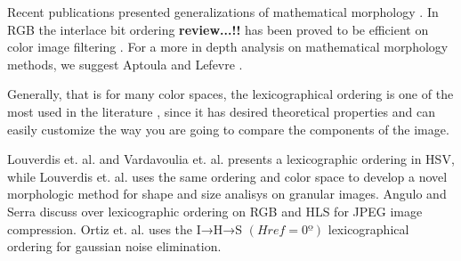 Recent publications presented generalizations of mathematical morphology \cite{ledoux2012limits, van2013group, velasco2012random, lezoray2009learning, velasco2010morphological, burgeth2013morphology, velasco2011supervised, hanbury2001morphological, angulo2010pseudo, aptoula2008alpha, kleefeld2015processing, vazquez2014color}. In RGB the interlace bit ordering \textbf{review...!!} has been proved to be efficient on color image filtering \cite{chanussot1997bit}. For a more in depth analysis on mathematical morphology methods, we suggest Aptoula and Lefevre \cite{aptoula2007comparative}. %


Generally, that is for many color spaces, the lexicographical ordering is one of the most used in the literature \cite{aptoula2007comparative, aptoula2008lexicographical}, since it has desired theoretical properties and can easily customize the way you are going to compare the components of the image. 

Louverdis et. al. \cite{louverdis2002new} and Vardavoulia et. al. \cite{vardavoulia2002vector} presents a lexicographic ordering in HSV, while Louverdis et. al. \cite{louverdis2002morphological} uses the same ordering and color space to develop a novel morphologic method for shape and size analisys on granular images. Angulo and Serra \cite{angulo2003morphological} discuss over lexicographic ordering on RGB and HLS for JPEG image compression. Ortiz et. al. \cite{ortiz2004gaussian} uses the I→H→S $(Href=0º)$ lexicographical ordering for gaussian noise elimination.

